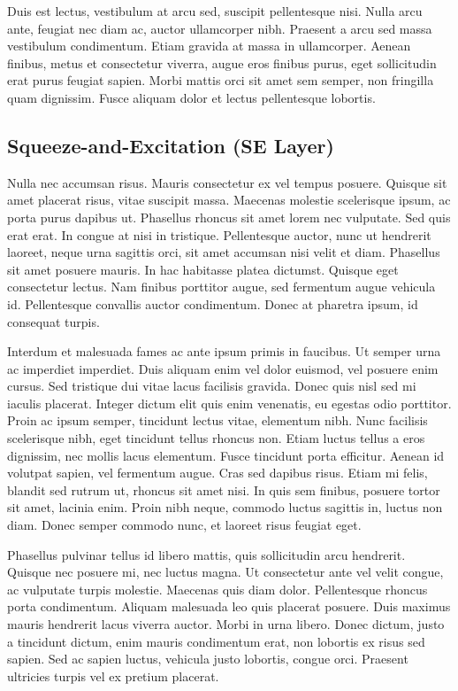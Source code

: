 Duis est lectus, vestibulum at arcu sed, suscipit pellentesque nisi. Nulla arcu ante, feugiat nec diam ac, auctor ullamcorper nibh. Praesent a arcu sed massa vestibulum condimentum. Etiam gravida at massa in ullamcorper. Aenean finibus, metus et consectetur viverra, augue eros finibus purus, eget sollicitudin erat purus feugiat sapien. Morbi mattis orci sit amet sem semper, non fringilla quam dignissim. Fusce aliquam dolor et lectus pellentesque lobortis. 

\subsection{Squeeze-and-Excitation (SE Layer)} %
\label{sub:amet}
Nulla nec accumsan risus. Mauris consectetur ex vel tempus posuere. Quisque sit amet placerat risus, vitae suscipit massa. Maecenas molestie scelerisque ipsum, ac porta purus dapibus ut. Phasellus rhoncus sit amet lorem nec vulputate. Sed quis erat erat. In congue at nisi in tristique. Pellentesque auctor, nunc ut hendrerit laoreet, neque urna sagittis orci, sit amet accumsan nisi velit et diam. Phasellus sit amet posuere mauris. In hac habitasse platea dictumst. Quisque eget consectetur lectus. Nam finibus porttitor augue, sed fermentum augue vehicula id. Pellentesque convallis auctor condimentum. Donec at pharetra ipsum, id consequat turpis.

Interdum et malesuada fames ac ante ipsum primis in faucibus. Ut semper urna ac imperdiet imperdiet. Duis aliquam enim vel dolor euismod, vel posuere enim cursus. Sed tristique dui vitae lacus facilisis gravida. Donec quis nisl sed mi iaculis placerat. Integer dictum elit quis enim venenatis, eu egestas odio porttitor. Proin ac ipsum semper, tincidunt lectus vitae, elementum nibh. Nunc facilisis scelerisque nibh, eget tincidunt tellus rhoncus non. Etiam luctus tellus a eros dignissim, nec mollis lacus elementum. Fusce tincidunt porta efficitur. Aenean id volutpat sapien, vel fermentum augue. Cras sed dapibus risus. Etiam mi felis, blandit sed rutrum ut, rhoncus sit amet nisi. In quis sem finibus, posuere tortor sit amet, lacinia enim. Proin nibh neque, commodo luctus sagittis in, luctus non diam. Donec semper commodo nunc, et laoreet risus feugiat eget.

Phasellus pulvinar tellus id libero mattis, quis sollicitudin arcu hendrerit. Quisque nec posuere mi, nec luctus magna. Ut consectetur ante vel velit congue, ac vulputate turpis molestie. Maecenas quis diam dolor. Pellentesque rhoncus porta condimentum. Aliquam malesuada leo quis placerat posuere. Duis maximus mauris hendrerit lacus viverra auctor. Morbi in urna libero. Donec dictum, justo a tincidunt dictum, enim mauris condimentum erat, non lobortis ex risus sed sapien. Sed ac sapien luctus, vehicula justo lobortis, congue orci. Praesent ultricies turpis vel ex pretium placerat.


